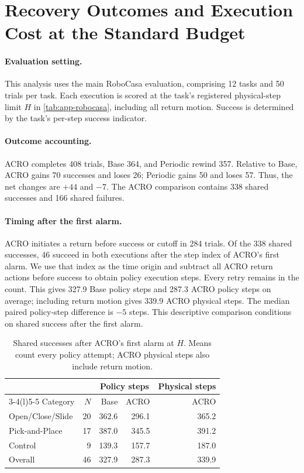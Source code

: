 \section{Recovery Outcomes and Execution Cost at the Standard Budget}
\label{app:recovery-timing}

\paragraph{Evaluation setting.}
This analysis uses the main RoboCasa evaluation, comprising 12 tasks and 50 trials per task. Each execution is scored at the task's registered physical-step limit $H$ in \cref{tab:app-robocasa}, including all return motion. Success is determined by the task's per-step success indicator.

\paragraph{Outcome accounting.}
ACRO completes 408 trials, Base 364, and Periodic rewind 357. Relative to Base, ACRO gains 70 successes and loses 26; Periodic gains 50 and loses 57. Thus, the net changes are $+44$ and $-7$. The ACRO comparison contains 338 shared successes and 166 shared failures.

\paragraph{Timing after the first alarm.}
ACRO initiates a return before success or cutoff in 284 trials. Of the 338 shared successes, 46 succeed in both executions after the step index of ACRO's first alarm. We use that index as the time origin and subtract all ACRO return actions before success to obtain policy execution steps. Every retry remains in the count. This gives 327.9 Base policy steps and 287.3 ACRO policy steps on average; including return motion gives 339.9 ACRO physical steps. The median paired policy-step difference is $-5$ steps. This descriptive comparison conditions on shared success after the first alarm.

\begin{table}[!ht]
\centering
\small
\caption{Shared successes after ACRO's first alarm at $H$. Means count every policy attempt; ACRO physical steps also include return motion.}
\label{tab:paired-recovery}
\begin{tabular}{@{}lrrrr@{}}
\toprule
 & & \multicolumn{2}{c}{Policy steps} & Physical steps \\
\cmidrule(lr){3-4}\cmidrule(l){5-5}
Category & $N$ & Base & ACRO & ACRO \\
\midrule
Open/Close/Slide & 20 & 362.6 & 296.1 & 365.2 \\
Pick-and-Place & 17 & 387.0 & 345.5 & 391.2 \\
Control & 9 & 139.3 & 157.7 & 187.0 \\
\midrule
Overall & 46 & 327.9 & 287.3 & 339.9 \\
\bottomrule
\end{tabular}
\end{table}

